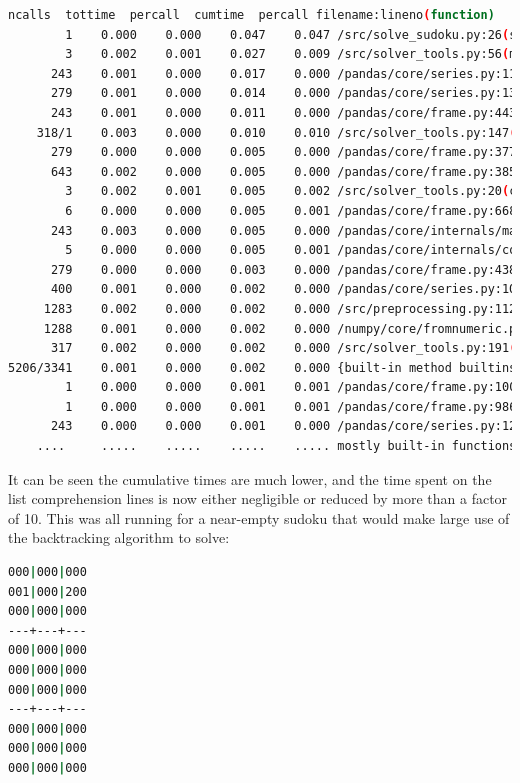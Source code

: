 \documentclass[12pt]{report} %
\begin{document}
\begin{lstlisting}[language=Bash, basicstyle=\tiny]
   ncalls  tottime  percall  cumtime  percall filename:lineno(function)
        1    0.000    0.000    0.047    0.047 /src/solve_sudoku.py:26(solve_sudoku)
        3    0.002    0.001    0.027    0.009 /src/solver_tools.py:56(markup)
      243    0.001    0.000    0.017    0.000 /pandas/core/series.py:1180(__setitem__)
      279    0.001    0.000    0.014    0.000 /pandas/core/series.py:1396(_maybe_update_cacher)
      243    0.001    0.000    0.011    0.000 /pandas/core/frame.py:4430(_maybe_cache_changed)
    318/1    0.003    0.000    0.010    0.010 /src/solver_tools.py:147(backtrack_alg)
      279    0.000    0.000    0.005    0.000 /pandas/core/frame.py:3779(_ixs)
      643    0.002    0.000    0.005    0.000 /pandas/core/frame.py:3856(__getitem__)
        3    0.002    0.001    0.005    0.002 /src/solver_tools.py:20(check_sudoku)
        6    0.000    0.000    0.005    0.001 /pandas/core/frame.py:668(__init__)
      243    0.003    0.000    0.005    0.000 /pandas/core/internals/managers.py:1045(iset)
        5    0.000    0.000    0.005    0.001 /pandas/core/internals/construction.py:423(dict_to_mgr)
      279    0.000    0.000    0.003    0.000 /pandas/core/frame.py:4387(_box_col_values)
      400    0.001    0.000    0.002    0.000 /pandas/core/series.py:1016(__getitem__)
     1283    0.002    0.000    0.002    0.000 /src/preprocessing.py:112(box)
     1288    0.001    0.000    0.002    0.000 /numpy/core/fromnumeric.py:1768(ravel)
      317    0.002    0.000    0.002    0.000 /src/solver_tools.py:191(<listcomp>)
5206/3341    0.001    0.000    0.002    0.000 {built-in method builtins.len}
        1    0.000    0.000    0.001    0.001 /pandas/core/frame.py:10039(map)
        1    0.000    0.000    0.001    0.001 /pandas/core/frame.py:9867(apply)
      243    0.000    0.000    0.001    0.000 /pandas/core/series.py:1270(_set_with_engine)
    ....     .....    .....    .....    ..... mostly built-in functions of packages

\end{lstlisting}

It can be seen the cumulative times are much lower, and the time spent on the list comprehension lines is now either negligible or reduced by more than a factor of 10. This was all running for a near-empty sudoku that would make large use of the backtracking algorithm to solve:

\begin{lstlisting}[language=Bash, basicstyle=\tiny]
000|000|000
001|000|200
000|000|000
---+---+---
000|000|000
000|000|000
000|000|000
---+---+---
000|000|000
000|000|000
000|000|000
\end{lstlisting}
\end{document}
